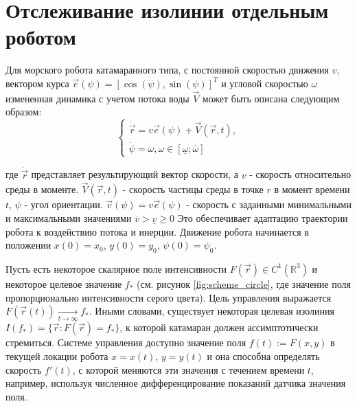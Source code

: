 \section{Отслеживание изолинии отдельным роботом}\label{sec:ch1/sec1}

Для морского робота катамаранного типа, с постоянной скоростью движения $v$, вектором курса $\vec{e}(\psi) = [\cos(\psi), \sin(\psi)]^T$ и угловой скоростью $\omega$ измененная динамика с учетом потока воды $\vec{V}$ может быть описана следующим образом:
\begin{equation}
    \begin{cases}
        \dot{\vec{r}} = v\vec{e}(\psi) + \vec{V}(\vec{r}, t), \\
        \dot{\psi} = \omega,  \omega \in [\underline{\omega}; \overline{\omega}]
    \end{cases}
\end{equation}

где ${\dot{\vec{r}}}$ представляет результирующий вектор скорости, а $v$ - скорость относительно среды в моменте. $\vec{V}(\vec{r}, t)$ - скорость частицы среды в точке $r$ в момент времени $t$, $\psi$ - угол ориентации. $\vec{v}(\psi) = v\vec{e}(\psi)$ - скорость с заданными минимальными и максимальными значениями $\overline{v} > \underline{v} \geq 0$ Это обеспечивает адаптацию траектории робота к воздействию потока и инерции. Движение робота  начинается в положении $x(0) = x_0$, $y(0) = y_0$, $\psi(0) = \psi_0$.

Пусть есть некоторое скалярное поле интенсивности $F(\vec{r}) \in C^1(\mathbb{R}^3)$  и некоторое целевое значение $f_\ast$ (см. рисунок \ref{fig:scheme_circle}, где значение поля пропорционально интенсивности  серого цвета). Цель управления выражается $F(\vec{r}(t)) \underset{t \to \infty}{\longrightarrow} f_\ast$. Иными словами, существует некоторая целевая изолиния $I(f_\ast) = \{ \vec{r}: F(\vec{r})=f_\ast\}$, к которой катамаран должен ассимптотически стремиться. Системе управления доступно значение поля $f(t) := F(x,y)$ в текущей  локации робота $x = x(t)$, $y = y(t)$ и она способна определять скорость $f'(t)$, с которой меняются эти значения с течением времени $t$, например, используя  численное дифференцирование показаний датчика значения поля.

